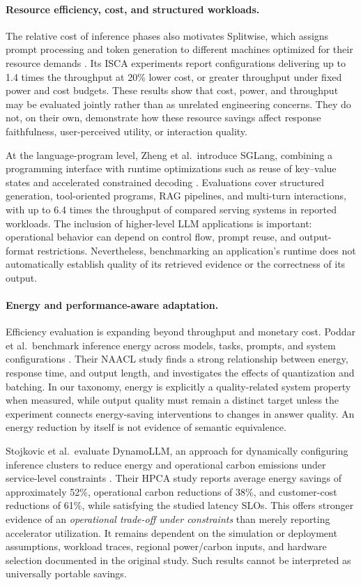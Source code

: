 \paragraph{Resource efficiency, cost, and structured workloads.}
The relative cost of inference phases also motivates Splitwise, which assigns prompt processing and token generation to different machines optimized for their resource demands \cite{patel2024splitwise}. Its ISCA experiments report configurations delivering up to 1.4 times the throughput at 20\% lower cost, or greater throughput under fixed power and cost budgets. These results show that cost, power, and throughput may be evaluated jointly rather than as unrelated engineering concerns. They do not, on their own, demonstrate how these resource savings affect response faithfulness, user-perceived utility, or interaction quality.

At the language-program level, Zheng et al.\ introduce SGLang, combining a programming interface with runtime optimizations such as reuse of key--value states and accelerated constrained decoding \cite{zheng2024sglang}. Evaluations cover structured generation, tool-oriented programs, RAG pipelines, and multi-turn interactions, with up to 6.4 times the throughput of compared serving systems in reported workloads. The inclusion of higher-level LLM applications is important: operational behavior can depend on control flow, prompt reuse, and output-format restrictions. Nevertheless, benchmarking an application's runtime does not automatically establish quality of its retrieved evidence or the correctness of its output.

\paragraph{Energy and performance-aware adaptation.}
Efficiency evaluation is expanding beyond throughput and monetary cost. Poddar et al.\ benchmark inference energy across models, tasks, prompts, and system configurations \cite{poddar2025energy}. Their NAACL study finds a strong relationship between energy, response time, and output length, and investigates the effects of quantization and batching. In our taxonomy, energy is explicitly a quality-related system property when measured, while output quality must remain a distinct target unless the experiment connects energy-saving interventions to changes in answer quality. An energy reduction by itself is not evidence of semantic equivalence.

Stojkovic et al.\ evaluate DynamoLLM, an approach for dynamically configuring inference clusters to reduce energy and operational carbon emissions under service-level constraints \cite{stojkovic2025dynamollm}. Their HPCA study reports average energy savings of approximately 52\%, operational carbon reductions of 38\%, and customer-cost reductions of 61\%, while satisfying the studied latency SLOs. This offers stronger evidence of an \emph{operational trade-off under constraints} than merely reporting accelerator utilization. It remains dependent on the simulation or deployment assumptions, workload traces, regional power/carbon inputs, and hardware selection documented in the original study. Such results cannot be interpreted as universally portable savings.

